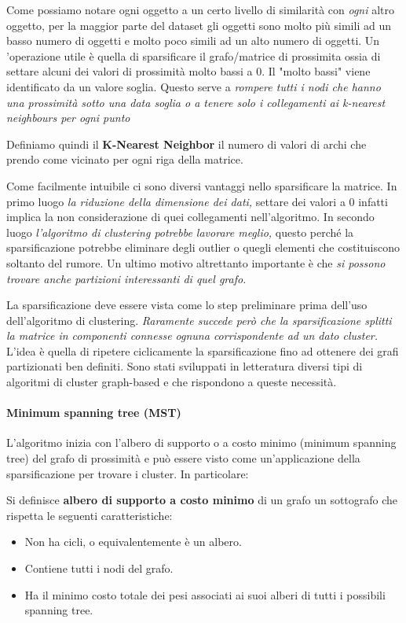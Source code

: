 Come possiamo notare ogni oggetto a un certo livello di similarità con \textit{ogni} altro oggetto, per la maggior parte del dataset gli oggetti sono molto più simili ad un basso numero di oggetti e molto poco simili ad un alto numero di oggetti. Un 'operazione utile è quella di sparsificare il grafo/matrice di prossimita ossia di settare alcuni dei valori di prossimità molto bassi a 0. Il "molto bassi" viene identificato da un valore soglia. Questo serve a \textit{rompere tutti i nodi che hanno una prossimità sotto una data soglia o a tenere solo i collegamenti ai k-nearest neighbours per ogni punto}

\begin{defn}
	Definiamo quindi il \textbf{K-Nearest Neighbor} il numero di valori di archi che prendo come vicinato per ogni riga della matrice.
\end{defn}
Come facilmente intuibile ci sono diversi vantaggi nello sparsificare la matrice. In primo luogo \textit{la riduzione della dimensione dei dati,} settare dei valori a 0 infatti implica la non considerazione di quei collegamenti nell'algoritmo. In secondo luogo \textit{ l'algoritmo di clustering potrebbe lavorare meglio,} questo perché la sparsificazione potrebbe eliminare degli outlier  o quegli elementi che costituiscono soltanto del rumore. Un ultimo motivo altrettanto importante è che \textit{si possono trovare anche partizioni interessanti di quel grafo.}

La sparsificazione deve essere vista come lo step preliminare prima dell'uso dell'algoritmo di clustering. \textit{Raramente succede però che la sparsificazione splitti la matrice in componenti connesse ognuna corrispondente ad un dato cluster.} L'idea è quella di ripetere ciclicamente la sparsificazione fino ad ottenere dei grafi partizionati ben definiti. Sono stati sviluppati in letteratura diversi tipi di algoritmi di cluster graph-based e che rispondono a queste necessità.

\paragraph{Minimum spanning tree (MST)} L'algoritmo inizia con l'albero di supporto o a costo minimo (minimum spanning tree) del grafo di prossimità e può essere visto come un'applicazione della sparsificazione per trovare i cluster. In particolare:
\begin{defn}
	Si definisce  \textbf{albero di supporto a costo minimo} di un grafo un sottografo che rispetta le seguenti caratteristiche:
	\begin{itemize}
		\item Non ha cicli, o equivalentemente è un albero.
		\item Contiene tutti i nodi del grafo.
		\item Ha il minimo costo totale dei pesi associati ai suoi alberi di tutti i possibili spanning tree.
	\end{itemize}
\end{defn}

